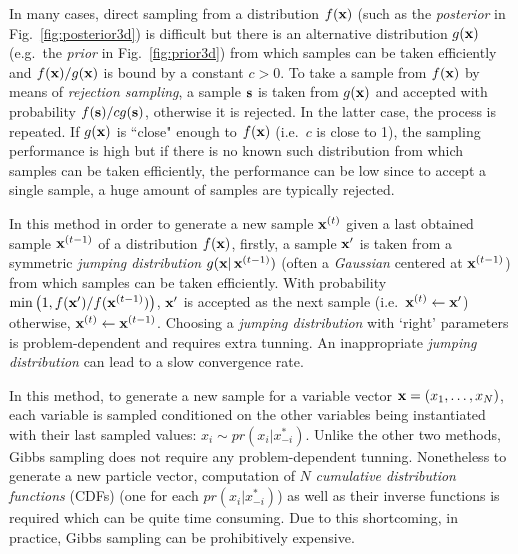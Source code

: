 In many cases, direct sampling from a distribution $f(\textbf{x})$ (such as the \emph{posterior} in Fig.~\ref{fig:posterior3d}) is difficult
but there is an alternative distribution $g(\textbf{x})$ (e.g.\ the \emph{prior} in Fig.~\ref{fig:prior3d})
from which samples can be taken efficiently and $f(\textbf{x})/g(\textbf{x})$ is bound by a constant $c>0$.
To take a sample from $f(\textbf{x})$ by means of \emph{rejection sampling}, 
a sample $\textbf{s}$ is taken from $g(\textbf{x})$ and accepted with probability $f(\textbf{s}) / c g(\textbf{s})$, 
otherwise it is rejected. In the latter case, the process is repeated. 
If $g(\textbf{x})$ is ``close" enough to $f(\textbf{x})$ (i.e.\ $c$ is close to 1), 
the sampling performance is high but if there is no known such distribution from which samples can be taken efficiently, the performance can be low 
since to accept a single sample, a huge amount of samples are typically rejected. 
%

In this method in order to generate a new sample $\textbf{x}^{(t)}$ given a last obtained sample $\textbf{x}^{(t-1)}$ of a distribution $f(\textbf{x})$, 
firstly, a sample $\textbf{x}'$ is taken 
from a symmetric \emph{jumping distribution} $g(\textbf{x} |\, \textbf{x}^{(t-1)})$ (often a \emph{Gaussian} centered at $\textbf{x}^{(t-1)}$) from which samples can be taken efficiently. 
With probability $\min \big(1, f(\textbf{x}')/f(\textbf{x}^{(t-1)}) \big)$, 
$\textbf{x}'$ is accepted as the next sample (i.e.\ $\textbf{x}^{(t)} \leftarrow \textbf{x}'$)
otherwise, %
$\textbf{x}^{(t)} \leftarrow \textbf{x}^{(t-1)}$. 
Choosing a \emph{jumping distribution} with `right' parameters is problem-dependent and requires extra tunning. An inappropriate \emph{jumping distribution} can lead to a slow convergence rate.
%

In this method, to generate a new sample for a variable vector $\textbf{x} = (x_1, \ldots, x_N)$, 
each variable is sampled conditioned on the other variables being instantiated with their last sampled values:
$x_i \sim pr(x_i | x_{-i}^*)$. 
Unlike the other two methods, Gibbs sampling does not require any problem-dependent tunning. Nonetheless to generate a new particle vector, 
computation of $N$ \emph{cumulative distribution functions} (CDFs) 
(one for each $pr(x_i | x_{-i}^*)$) as well as their inverse functions is required which can be quite time consuming. 
Due to this shortcoming, in practice, Gibbs sampling can be prohibitively expensive.   

